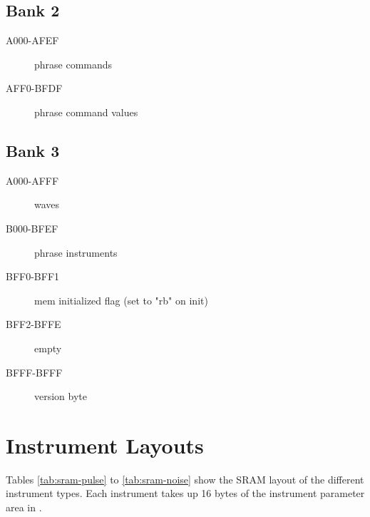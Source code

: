 \subsection{Bank 2}

\begin{description}
    \item[A000-AFEF] phrase commands
    \item[AFF0-BFDF] phrase command values
\end{description}

\subsection{Bank 3}

\begin{description}
    \item[A000-AFFF] waves
    \item[B000-BFEF] phrase instruments
    \item[BFF0-BFF1] mem initialized flag (set to "rb" on init)
    \item[BFF2-BFFE] empty
    \item[BFFF-BFFF] version byte
\end{description}

\section{Instrument Layouts}

Tables \ref{tab:sram-pulse} to \ref{tab:sram-noise} show the SRAM layout of the different instrument types. Each instrument takes up 16 bytes of the instrument parameter area in .

